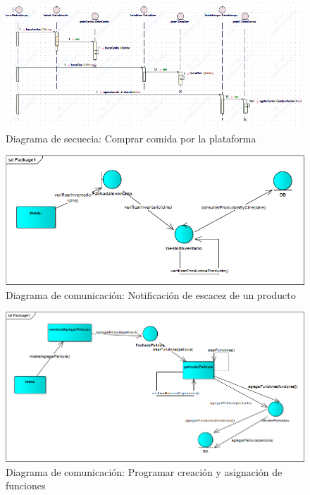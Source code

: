\begin{figure}[h!]
\centering
\includegraphics[width=1\linewidth]{diseno/requerimientos/imgs/compraCombosSec}
	\caption{Diagrama de secuecia: Comprar comida por la plataforma}
\end{figure}




\begin{figure}[h!]
\centering
\includegraphics[width=1\linewidth]{diseno/requerimientos/imgs/EscacezCom}
	\caption{Diagrama de comunicación: Notificación de escacez de un producto}
\end{figure}


\begin{figure}[h!]
\centering
\includegraphics[width=1\linewidth]{diseno/requerimientos/imgs/FuncionesCom}
	\caption{Diagrama de comunicación: Programar creación y asignación de funciones}
\end{figure}

